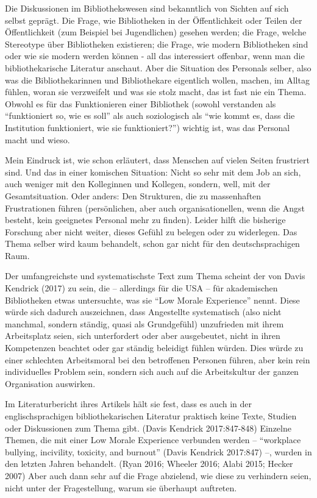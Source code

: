 \documentclass[a4paper,
fontsize=11pt,
oneside,
numbers=noperiodatend,
parskip=half-,
bibliography=totoc,
final
]{scrartcl}
\begin{document}
Die Diskussionen im Bibliothekswesen sind bekanntlich von Sichten auf
sich selbst geprägt. Die Frage, wie Bibliotheken in der Öffentlichkeit
oder Teilen der Öffentlichkeit (zum Beispiel bei Jugendlichen) gesehen
werden; die Frage, welche Stereotype über Bibliotheken existieren; die
Frage, wie modern Bibliotheken sind oder wie sie modern werden können -
all das interessiert offenbar, wenn man die bibliothekarische Literatur
anschaut. Aber die Situation des Personals selber, also was die
Bibliothekarinnen und Bibliothekare eigentlich wollen, machen, im Alltag
fühlen, woran sie verzweifelt und was sie stolz macht, das ist fast nie
ein Thema. Obwohl es für das Funktionieren einer Bibliothek (sowohl
verstanden als \enquote{funktioniert so, wie es soll} als auch
soziologisch als \enquote{wie kommt es, dass die Institution
funktioniert, wie sie funktioniert?}) wichtig ist, was das Personal
macht und wieso.

Mein Eindruck ist, wie schon erläutert, dass Menschen auf vielen Seiten
frustriert sind. Und das in einer komischen Situation: Nicht so sehr mit
dem Job an sich, auch weniger mit den Kolleginnen und Kollegen, sondern,
well, mit der Gesamtsituation. Oder anders: Den Strukturen, die zu
massenhaften Frustrationen führen (persönlichen, aber auch
organisationellen, wenn die Angst besteht, kein geeignetes Personal mehr
zu finden). Leider hilft die bisherige Forschung aber nicht weiter,
dieses Gefühl zu belegen oder zu widerlegen. Das Thema selber wird kaum
behandelt, schon gar nicht für den deutschsprachigen Raum.

Der umfangreichste und systematischste Text zum Thema scheint der von
Davis Kendrick (2017) zu sein, die -- allerdings für die USA -- für
akademischen Bibliotheken etwas untersuchte, was sie \enquote{Low Morale
Experience} nennt. Diese würde sich dadurch auszeichnen, dass
Angestellte systematisch (also nicht manchmal, sondern ständig, quasi
als Grundgefühl) unzufrieden mit ihrem Arbeitsplatz seien, sich
unterfordert oder aber ausgebeutet, nicht in ihren Kompetenzen beachtet
oder gar ständig beleidigt fühlen würden. Dies würde zu einer schlechten
Arbeitsmoral bei den betroffenen Personen führen, aber kein rein
individuelles Problem sein, sondern sich auch auf die Arbeitskultur der
ganzen Organisation auswirken.

Im Literaturbericht ihres Artikels hält sie fest, dass es auch in der
englischsprachigen bibliothekarischen Literatur praktisch keine Texte,
Studien oder Diskussionen zum Thema gibt. (Davis Kendrick 2017:847-848)
Einzelne Themen, die mit einer Low Morale Experience verbunden werden --
\enquote{workplace bullying, incivility, toxicity, and burnout} (Davis
Kendrick 2017:847) --, wurden in den letzten Jahren behandelt. (Ryan
2016; Wheeler 2016; Alabi 2015; Hecker 2007) Aber auch dann sehr auf die
Frage abzielend, wie diese zu verhindern seien, nicht unter der
Fragestellung, warum sie überhaupt auftreten.
\end{document}
